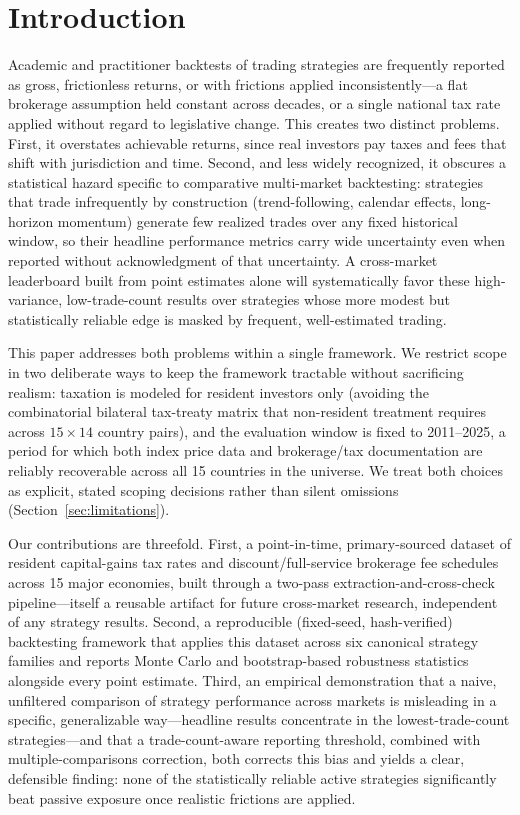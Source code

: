 \documentclass[11pt]{article}
\begin{document}
\section{Introduction}

Academic and practitioner backtests of trading strategies are frequently reported as gross, frictionless returns, or with frictions applied inconsistently---a flat brokerage assumption held constant across decades, or a single national tax rate applied without regard to legislative change. This creates two distinct problems. First, it overstates achievable returns, since real investors pay taxes and fees that shift with jurisdiction and time. Second, and less widely recognized, it obscures a statistical hazard specific to comparative multi-market backtesting: strategies that trade infrequently by construction (trend-following, calendar effects, long-horizon momentum) generate few realized trades over any fixed historical window, so their headline performance metrics carry wide uncertainty even when reported without acknowledgment of that uncertainty. A cross-market leaderboard built from point estimates alone will systematically favor these high-variance, low-trade-count results over strategies whose more modest but statistically reliable edge is masked by frequent, well-estimated trading.

This paper addresses both problems within a single framework. We restrict scope in two deliberate ways to keep the framework tractable without sacrificing realism: taxation is modeled for resident investors only (avoiding the combinatorial bilateral tax-treaty matrix that non-resident treatment requires across $15 \times 14$ country pairs), and the evaluation window is fixed to 2011--2025, a period for which both index price data and brokerage/tax documentation are reliably recoverable across all 15 countries in the universe. We treat both choices as explicit, stated scoping decisions rather than silent omissions (Section~\ref{sec:limitations}).

Our contributions are threefold. First, a point-in-time, primary-sourced dataset of resident capital-gains tax rates and discount/full-service brokerage fee schedules across 15 major economies, built through a two-pass extraction-and-cross-check pipeline---itself a reusable artifact for future cross-market research, independent of any strategy results. Second, a reproducible (fixed-seed, hash-verified) backtesting framework that applies this dataset across six canonical strategy families and reports Monte Carlo and bootstrap-based robustness statistics alongside every point estimate. Third, an empirical demonstration that a naive, unfiltered comparison of strategy performance across markets is misleading in a specific, generalizable way---headline results concentrate in the lowest-trade-count strategies---and that a trade-count-aware reporting threshold, combined with multiple-comparisons correction, both corrects this bias and yields a clear, defensible finding: none of the statistically reliable active strategies significantly beat passive exposure once realistic frictions are applied.
\end{document}
